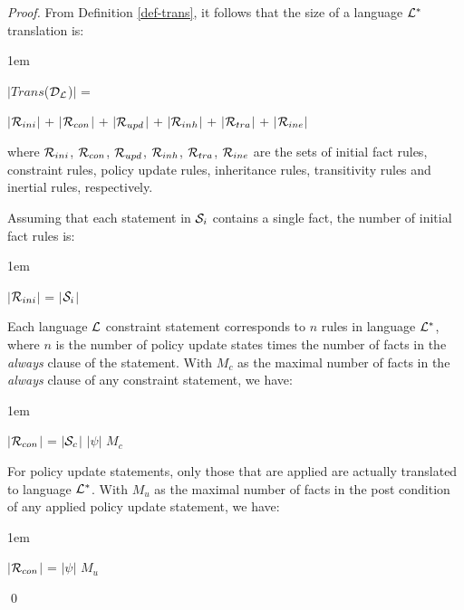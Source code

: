 \documentclass[global,twocolumn,draft]{svjour}
\newenvironment{vproof}
  {\begin{proof}\hspace{0.25em}}
  {\qed\end{proof}}
\newenvironment{vquote}
  {\begin{list}{}{\leftmargin 1em}\item[]}
  {\end{list}}
\begin{document}
        \begin{vproof}
          From Definition \ref{def-trans}, it follows that the size of a
          language ${\cal L}^{*}$ translation is:

          \begin{vquote}
            $|$$Trans$(${\cal D_{L}}$)$|$ =

            \hspace{1em}
            $|$${\cal R}_{ini}$$|$ +
            $|$${\cal R}_{con}$$|$ +
            $|$${\cal R}_{upd}$$|$ +
            $|$${\cal R}_{inh}$$|$ +
            $|$${\cal R}_{tra}$$|$ +
            $|$${\cal R}_{ine}$$|$
          \end{vquote}

          where ${\cal R}_{ini}$, ${\cal R}_{con}$, ${\cal R}_{upd}$,
          ${\cal R}_{inh}$, ${\cal R}_{tra}$, ${\cal R}_{ine}$ are the sets of
          initial fact rules, constraint rules, policy update rules,
          inheritance rules, transitivity rules and inertial rules,
          respectively.

          Assuming that each statement in ${\cal S}_{i}$ contains a single
          fact, the number of initial fact rules is:

          \begin{vquote}
            $|$${\cal R}_{ini}$$|$ = $|$${\cal S}_{i}$$|$
          \end{vquote}

          Each language ${\cal L}$ constraint statement corresponds to $n$
          rules in language ${\cal L}^{*}$, where $n$ is the number of policy
          update states times the number of facts in the {\em always} clause of
          the statement. With $M_{c}$ as the maximal number of facts in the
          {\em always} clause of any constraint statement, we have:

          \begin{vquote}
            $|$${\cal R}_{con}$$|$ = $|$${\cal S}_{c}$$|$ $|\psi|$ $M_{c}$
          \end{vquote}

          For policy update statements, only those that are applied are
          actually translated to language ${\cal L}^{*}$. With $M_{u}$ as the
          maximal number of facts in the post condition of any applied policy
          update statement, we have:

          \begin{vquote}
            $|$${\cal R}_{con}$$|$ = $|\psi|$ $M_{u}$
          \end{vquote}


\end{vproof}
\end{document}

